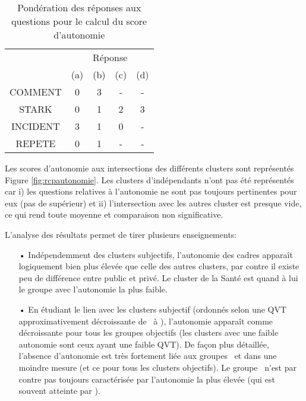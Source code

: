 \documentclass[11pt,fleqn,openany,frenchb]{book} %
\begin{document}
\bgroup
\def\arraystretch{1.5}
\begin{table}[!h]
\centering
\begin{tabular}{|c|c|c|c|c|}
\cline{2-5}
\multicolumn{1}{c}{}&\multicolumn{4}{|c|}{Réponse}\\ \cline{2-5}
\multicolumn{1}{c}{} & \multicolumn{1}{|c}{(a)} & \multicolumn{1}{|c}{(b)} & \multicolumn{1}{|c}{(c)}  & \multicolumn{1}{|c|}{(d)} \\ \hline
COMMENT & 0 & 3 & - & - \\ 
\hline 
STARK & 0 & 1 & 2 & 3 \\
\hline
INCIDENT & 3 & 1 & 0 & - \\ 
\hline 
REPETE & 0 & 1 & - & - \\
\hline

\end{tabular}
\caption{Pondération des réponses aux questions pour le calcul du score d'autonomie}

\label{tab:autonomiescore}
\end{table}
\bgroup
\def\arraystretch{1}

Les scores d'autonomie aux intersections des différents clusters sont représentés Figure \ref{fig:rcpautonomie}. Les clusters d'indépendants n'ont pas été représentés car i) les questions relatives à l'autonomie ne sont pas toujours pertinentes pour eux (pas de supérieur) et ii) l'intersection avec les autres cluster est presque vide, ce qui rend toute moyenne et comparaison non significative.

L'analyse des résultats permet de tirer plusieurs enseignements:
    \begin{itemize}
    \item[•] Indépendemment des clusters subjectifs, l'autonomie des cadres apparaît logiquement bien plus élevée que celle des autres clusters, par contre il existe peu de différence entre public et privé. Le cluster de la Santé est quand à lui le groupe avec l'autonomie la plus faible.
    \item[•] En étudiant le lien avec les clusters subjectif (ordonnés selon une QVT approximativement décroissante de \HEUR\ à \MALH ), l'autonomie apparaît comme décroissante pour tous les groupes objectifs (les clusters avec une faible autonomie sont ceux ayant une faible QVT). De façon plus détaillée, l'absence d'autonomie est très fortement liée aux groupes \MALH\ et dans une moindre mesure \ENV (et ce pour tous les clusters objectifs). Le groupe \HEUR\ n'est par contre pas toujours caractérisée par l'autonomie la plus élevée (qui est souvent atteinte par \RAS ).  
    \end{itemize}
\end{document}
